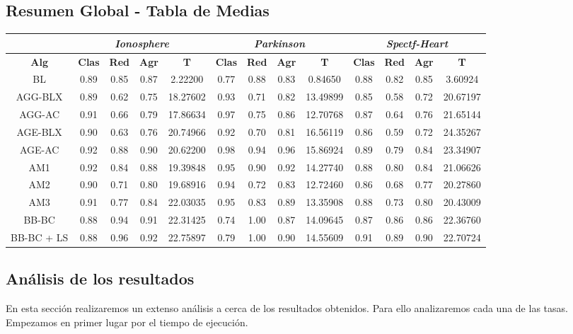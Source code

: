\documentclass[10pt, a4paper]{article}
\theoremstyle{theorem-style}
\theoremstyle{theorem-style}
\theoremstyle{theorem2-style}
\theoremstyle{definition-style}
\theoremstyle{remark-style}
\theoremstyle{example-style}
\theoremstyle{definition-style}
\theoremstyle{remark-style}
\theoremstyle{remark-style}
\begin{document}
\subsection{Resumen Global - Tabla de Medias}
\begin{table}[h]
\begin{tabular}{ccccc|cccc|cccc}
\centering
 & \multicolumn{4}{c}{\textit{Ionosphere}} & \multicolumn{4}{c}{\textit{Parkinson}} & \multicolumn{4}{c}{\textit{Spectf-Heart}} \\ \hline
\textbf{Alg} & \textbf{Clas} & \textbf{Red} & \textbf{Agr} & \textbf{T} & \textbf{Clas} & \textbf{Red} & \textbf{Agr} & \textbf{T} & \textbf{Clas} & \textbf{Red} & \textbf{Agr} & \textbf{T} \\ \hline
BL & 0.89 & 0.85 & 0.87 & 2.22200	&0.77 & 0.88 & 0.83 & 0.84650	&	0.88 & 0.82 & 0.85 & 3.60924\\
AGG-BLX & 0.89 & 0.62 & 0.75 & 18.27602	& 0.93 & 0.71 & 0.82 & 13.49899	&	0.85 & 0.58 & 0.72 & 20.67197 \\
AGG-AC & 0.91 & 0.66 & 0.79 & 17.86634&	0.97 & 0.75 & 0.86 & 12.70768&		0.87 & 0.64 & 0.76 & 21.65144 \\ 
AGE-BLX & 0.90 & 0.63 & 0.76 & 20.74966	&0.92 & 0.70 & 0.81 & 16.56119	&	0.86 & 0.59 & 0.72 & 24.35267 \\
AGE-AC & 0.92 & 0.88 & 0.90 & 20.62200&	0.98 & 0.94 & 0.96 & 15.86924	&	0.89 & 0.79 & 0.84 & 23.34907 \\
AM1 & 0.92 & 0.84 & 0.88 & 19.39848	&0.95 & 0.90 & 0.92 & 14.27740	&	0.88 & 0.80 & 0.84 & 21.06626 \\
AM2 & 0.90 & 0.71 & 0.80 & 19.68916	&0.94 & 0.72 & 0.83 & 12.72460	&	0.86 & 0.68 & 0.77 & 20.27860 \\
AM3 & 0.91 & 0.77 & 0.84 & 22.03035	&0.95 & 0.83 & 0.89 & 13.35908	&	0.88 & 0.73 & 0.80 & 20.43009 \\
\hline
BB-BC & 0.88 & 0.94 & 0.91 & 22.31425 &	0.74 & 1.00 & 0.87 & 14.09645 &		0.87 & 0.86 & 0.86 & 22.36760\\
BB-BC + LS & 0.88 & 0.96 & 0.92 & 22.75897 &	0.79 & 1.00 & 0.90 & 14.55609 &		0.91 & 0.89 & 0.90 & 22.70724
\end{tabular}
\end{table}


\subsection{Análisis de los resultados}

En esta sección realizaremos un extenso análisis a cerca de los resultados obtenidos. Para ello analizaremos cada una de las tasas. Empezamos en primer lugar por el tiempo de ejecución. 
\end{document}
